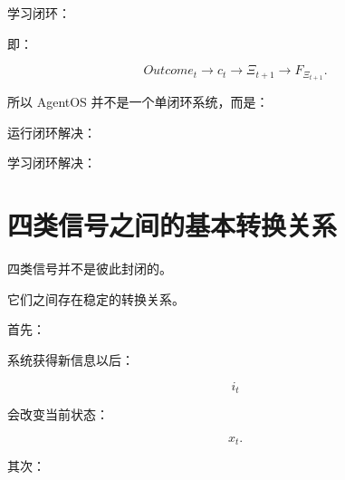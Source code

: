 学习闭环：

\begin{statementbox}
\centering
{}
\end{statementbox}

即：

\[
Outcome_t
\rightarrow
c_t
\rightarrow
\Xi_{t+1}
\rightarrow
F_{\Xi_{t+1}}.
\]

所以 AgentOS 并不是一个单闭环系统，而是：

\begin{statementbox}
\centering
{}
\end{statementbox}

运行闭环解决：

\begin{statementbox}
\centering
{}
\end{statementbox}

学习闭环解决：

\begin{statementbox}
\centering
{}
\end{statementbox}

\section{四类信号之间的基本转换关系}

四类信号并不是彼此封闭的。

它们之间存在稳定的转换关系。

首先：

\begin{statementbox}
\centering
{}
\end{statementbox}

系统获得新信息以后：

\[
i_t
\]

会改变当前状态：

\[
x_t.
\]

其次：

\begin{statementbox}
\centering
{}
\end{statementbox}

